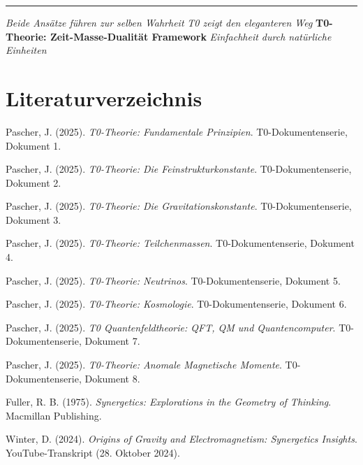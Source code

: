 \documentclass[12pt,a4paper]{article}
\begin{document}
	\vfill
	
	\begin{center}
		\hrule
		\vspace{0.5cm}
		\textit{Beide Ansätze führen zur selben Wahrheit}
		\textit{T0 zeigt den eleganteren Weg}
		\vspace{0.3cm}
		\textbf{T0-Theorie: Zeit-Masse-Dualität Framework}
		\textit{Einfachheit durch natürliche Einheiten}
		\vspace{0.3cm}
	\end{center}
	
	\section{Literaturverzeichnis}
	
	\begin{thebibliography}{20}
		
		Pascher, J. (2025). 
		\textit{T0-Theorie: Fundamentale Prinzipien}. 
		T0-Dokumentenserie, Dokument 1.
		
		Pascher, J. (2025). 
		\textit{T0-Theorie: Die Feinstrukturkonstante}. 
		T0-Dokumentenserie, Dokument 2.
		
		Pascher, J. (2025). 
		\textit{T0-Theorie: Die Gravitationskonstante}. 
		T0-Dokumentenserie, Dokument 3.
		
		Pascher, J. (2025). 
		\textit{T0-Theorie: Teilchenmassen}. 
		T0-Dokumentenserie, Dokument 4.
		
		Pascher, J. (2025). 
		\textit{T0-Theorie: Neutrinos}. 
		T0-Dokumentenserie, Dokument 5.
		
		Pascher, J. (2025). 
		\textit{T0-Theorie: Kosmologie}. 
		T0-Dokumentenserie, Dokument 6.
		
		Pascher, J. (2025). 
		\textit{T0 Quantenfeldtheorie: QFT, QM und Quantencomputer}. 
		T0-Dokumentenserie, Dokument 7.
		
		Pascher, J. (2025). 
		\textit{T0-Theorie: Anomale Magnetische Momente}. 
		T0-Dokumentenserie, Dokument 8.
		
		Fuller, R. B. (1975). 
		\textit{Synergetics: Explorations in the Geometry of Thinking}. 
		Macmillan Publishing.
		
		Winter, D. (2024). 
		\textit{Origins of Gravity and Electromagnetism: Synergetics Insights}. 
		YouTube-Transkript (28. Oktober 2024).
		

\end{thebibliography}
\end{document}
